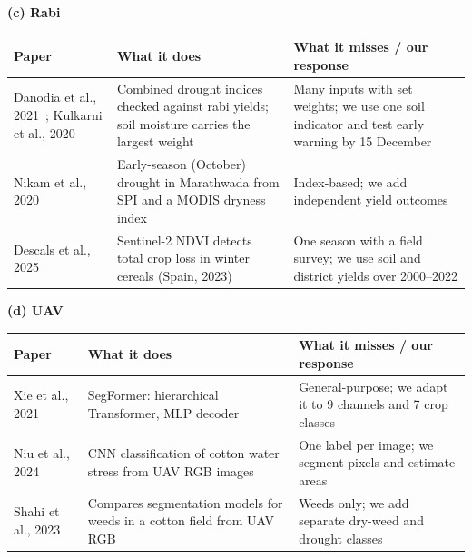 \documentclass[11pt,a4paper,oneside]{article}
\begin{document}
{\begin{minipage}{\textwidth}
\begin{tabularx}{\textwidth}{|>{\raggedright\arraybackslash}p{3.3cm}|Y|Y|}
\end{tabularx}
\end{minipage}
\par\vspace{7pt}\noindent\begin{minipage}{\textwidth}
{\small\textbf{(c) Rabi}}\\[3pt]
\begin{tabularx}{\textwidth}{|>{\raggedright\arraybackslash}p{3.3cm}|Y|Y|}
\hline
\textbf{Paper} & \textbf{What it does} & \textbf{What it misses / our response} \\ \hline
Danodia et al., 2021~\cite{danodia2021}; Kulkarni et al., 2020~\cite{kulkarni2020} & Combined drought indices checked against rabi yields; soil moisture carries the largest weight & Many inputs with set weights; we use one soil indicator and test early warning by 15 December \\ \hline
Nikam et al., 2020~\cite{nikam2020} & Early-season (October) drought in Marathwada from SPI and a MODIS dryness index & Index-based; we add independent yield outcomes \\ \hline
Descals et al., 2025~\cite{descals2025} & Sentinel-2 NDVI detects total crop loss in winter cereals (Spain, 2023) & One season with a field survey; we use soil and district yields over 2000--2022 \\ \hline
\end{tabularx}
\end{minipage}
\par\vspace{7pt}\noindent\begin{minipage}{\textwidth}
{\small\textbf{(d) UAV}}\\[3pt]
\begin{tabularx}{\textwidth}{|>{\raggedright\arraybackslash}p{3.3cm}|Y|Y|}
\hline
\textbf{Paper} & \textbf{What it does} & \textbf{What it misses / our response} \\ \hline
Xie et al., 2021~\cite{segformer2021} & SegFormer: hierarchical Transformer, MLP decoder & General-purpose; we adapt it to 9 channels and 7 crop classes \\ \hline
Niu et al., 2024~\cite{niu2024} & CNN classification of cotton water stress from UAV RGB images & One label per image; we segment pixels and estimate areas \\ \hline
Shahi et al., 2023~\cite{shahi2023} & Compares segmentation models for weeds in a cotton field from UAV RGB & Weeds only; we add separate dry-weed and drought classes \\ \hline
\end{tabularx}
\end{minipage}
\par\vspace{4pt}}
\end{document}
